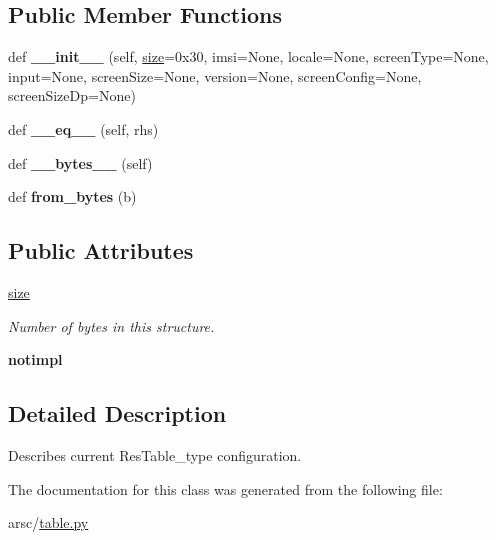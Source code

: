 \subsection*{Public Member Functions}
\begin{DoxyCompactItemize}
\item 
\mbox{\label{classtable_1_1ResTable__config_af08ea1d0d4f00405218eb1a3fccf3ef5}} 
def {\bfseries \+\_\+\+\_\+init\+\_\+\+\_\+} (self, \mbox{\hyperlink{classtable_1_1ResTable__config_aff874b3c667b44e6ca430bdce758b755}{size}}=0x30, imsi=\+None, locale=\+None, screen\+Type=\+None, input=\+None, screen\+Size=\+None, version=\+None, screen\+Config=\+None, screen\+Size\+Dp=\+None)
\item 
\mbox{\label{classtable_1_1ResTable__config_a805a7a2c7124b920b26d0fa78cf43511}} 
def {\bfseries \+\_\+\+\_\+eq\+\_\+\+\_\+} (self, rhs)
\item 
\mbox{\label{classtable_1_1ResTable__config_a84de8e03ccc63bffb5bdc5fd3748079e}} 
def {\bfseries \+\_\+\+\_\+bytes\+\_\+\+\_\+} (self)
\item 
\mbox{\label{classtable_1_1ResTable__config_a9c00500764d09aee496def0d526bdf83}} 
def {\bfseries from\+\_\+bytes} (b)
\end{DoxyCompactItemize}
\subsection*{Public Attributes}
\begin{DoxyCompactItemize}
\item 
\mbox{\label{classtable_1_1ResTable__config_aff874b3c667b44e6ca430bdce758b755}} 
\mbox{\hyperlink{classtable_1_1ResTable__config_aff874b3c667b44e6ca430bdce758b755}{size}}
\begin{DoxyCompactList}\small\item\em Number of bytes in this structure. \end{DoxyCompactList}\item 
\mbox{\label{classtable_1_1ResTable__config_acad8eacf30a0651a2c75e073dc0886e9}} 
{\bfseries notimpl}
\end{DoxyCompactItemize}


\subsection{Detailed Description}
Describes current Res\+Table\+\_\+type configuration. 

The documentation for this class was generated from the following file\+:\begin{DoxyCompactItemize}
\item 
arsc/\mbox{\hyperlink{table_8py}{table.\+py}}\end{DoxyCompactItemize}
